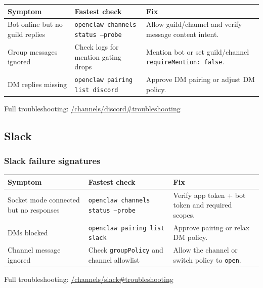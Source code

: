 \begin{table}[h]
\centering
\small
\begin{tabular}{|l|l|l|}
\hline
Symptom & Fastest check & Fix \\
\hline
Bot online but no guild replies & \texttt{openclaw channels status --probe} & Allow guild/channel and verify message content intent. \\
\hline
Group messages ignored & Check logs for mention gating drops & Mention bot or set guild/channel \texttt{requireMention: false}. \\
\hline
DM replies missing & \texttt{openclaw pairing list discord} & Approve DM pairing or adjust DM policy. \\
\hline
\end{tabular}
\end{table}



Full troubleshooting: \href{/channels/discord\#troubleshooting}{/channels/discord\#troubleshooting}

\subsection{Slack}


\subsubsection{Slack failure signatures}



\begin{table}[h]
\centering
\small
\begin{tabular}{|l|l|l|}
\hline
Symptom & Fastest check & Fix \\
\hline
Socket mode connected but no responses & \texttt{openclaw channels status --probe} & Verify app token + bot token and required scopes. \\
\hline
DMs blocked & \texttt{openclaw pairing list slack} & Approve pairing or relax DM policy. \\
\hline
Channel message ignored & Check \texttt{groupPolicy} and channel allowlist & Allow the channel or switch policy to \texttt{open}. \\
\hline
\end{tabular}
\end{table}



Full troubleshooting: \href{/channels/slack\#troubleshooting}{/channels/slack\#troubleshooting}

